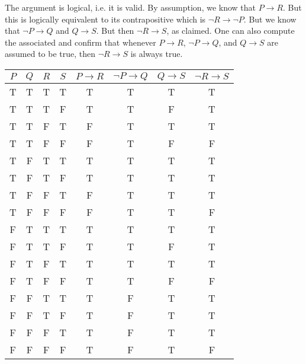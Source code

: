 \documentclass[11pt,letterpaper]{article}
\begin{document}
\sol The argument is logical, i.e. it is valid. By assumption, we know that $P \to R$. But this is logically equivalent to its contrapositive which is $\neg R \to \neg P$. But we know that $\neg P \to Q$ and $Q \to S$. But then $\neg R \to S$, as claimed. One can also compute the associated and confirm that whenever $P \to R$, $\neg P \to Q$, and $Q \to S$ are assumed to be true, then $\neg R \to S$ is always true. 
        \begin{table}[!ht]
        \centering
        \begin{tabular}{c|c|c|c||c|c|c||c}
        $P$ & $Q$ & $R$ & $S$ & $P \to R$ & $\neg P \to Q$ & $Q \to S$ & $\neg R \to S$ \\ \hline \hline \rowcolor{lightgray} 
        T & T & T & T & T & T & T & T \\
        T & T & T & F & T & T & F & T \\
        T & T & F & T & F & T & T & T \\
        T & T & F & F & F & T & F & F \\ \rowcolor{lightgray} 
        T & F & T & T & T & T & T & T \\ \rowcolor{lightgray} 
        T & F & T & F & T & T & T & T \\
        T & F & F & T & F & T & T & T \\
        T & F & F & F & F & T & T & F \\ \rowcolor{lightgray} 
        F & T & T & T & T & T & T & T \\
        F & T & T & F & T & T & F & T \\ \rowcolor{lightgray} 
        F & T & F & T & T & T & T & T \\
        F & T & F & F & T & T & F & F \\
        F & F & T & T & T & F & T & T \\
        F & F & T & F & T & F & T & T \\
        F & F & F & T & T & F & T & T \\
        F & F & F & F & T & F & T & F
        \end{tabular}
        \end{table}
\end{document}
